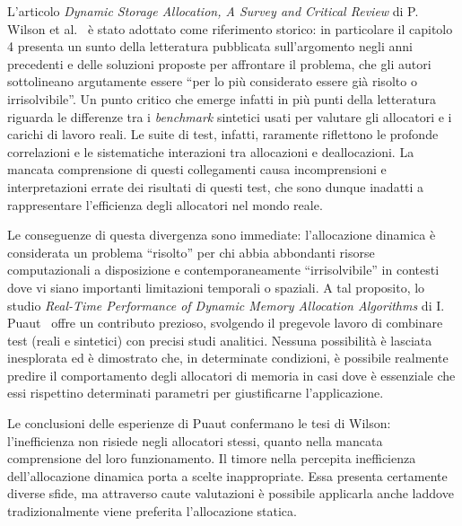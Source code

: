 L’articolo \textit{Dynamic Storage Allocation, A Survey and Critical Review} di P. Wilson et al.~\cite{wilson1995} è stato adottato come riferimento storico: in particolare il capitolo 4 presenta un sunto della letteratura pubblicata sull’argomento negli anni precedenti e delle soluzioni proposte per affrontare il problema, che gli autori sottolineano argutamente essere ``per lo più considerato essere già risolto o irrisolvibile''. Un punto critico che emerge infatti in più punti della letteratura riguarda le differenze tra i \textit{benchmark} sintetici usati per valutare gli allocatori e i carichi di lavoro reali. Le suite di test, infatti, raramente riflettono le profonde correlazioni e le sistematiche interazioni tra allocazioni e deallocazioni. La mancata comprensione di questi collegamenti causa incomprensioni e interpretazioni errate dei risultati di questi test, che sono dunque inadatti a rappresentare l’efficienza degli allocatori nel mondo reale.

Le conseguenze di questa divergenza sono immediate: l’allocazione dinamica è considerata un problema ``risolto'' per chi abbia abbondanti risorse computazionali a disposizione e contemporaneamente ``irrisolvibile'' in contesti dove vi siano importanti limitazioni temporali o spaziali. A tal proposito, lo studio \textit{Real-Time Performance of Dynamic Memory Allocation Algorithms} di I. Puaut~\cite{puaut2002} offre un contributo prezioso, svolgendo il pregevole lavoro di combinare test (reali e sintetici) con precisi studi analitici. Nessuna possibilità è lasciata inesplorata ed è dimostrato che, in determinate condizioni, è possibile realmente predire il comportamento degli allocatori di memoria in casi dove è essenziale che essi rispettino determinati parametri per giustificarne l’applicazione.

Le conclusioni delle esperienze di Puaut confermano le tesi di Wilson: l’inefficienza non risiede negli allocatori stessi, quanto nella mancata comprensione del loro funzionamento. Il timore nella percepita inefficienza dell’allocazione dinamica porta a scelte inappropriate. Essa presenta certamente diverse sfide, ma attraverso caute valutazioni è possibile applicarla anche laddove tradizionalmente viene preferita l’allocazione statica.

